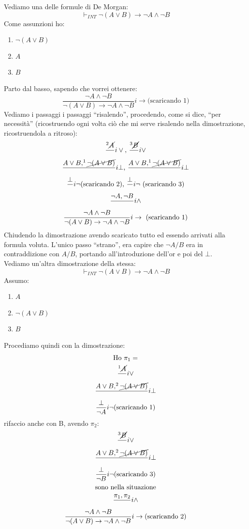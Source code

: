 \documentclass[a4paper,12pt, oneside]{book}
\begin{document}
\begin{esempio}
  Vediamo una delle formule di De Morgan:
  \[\vdash_{INT}\neg(A\lor B)\to \neg A\land \neg B\]
  Come assunzioni ho:
  \begin{enumerate}
    \item $\neg (A\lor B)$
    \item $A$
    \item $B$
  \end{enumerate}
  Parto dal basso, sapendo che vorrei ottenere:
  \[\frac{\neg A\land \neg B}{\neg(A\lor B)\to \neg A\land \neg B}i\to\mbox{
      (scaricando 1)}\]
  Vediamo i passaggi i passaggi ``risalendo'', procedendo, come si dice, ``per
  necessità'' (ricostruendo ogni volta ciò che mi serve risalendo nella
  dimostrazione, ricostruendola a ritroso): 
  \begin{gather*}
    \frac{^2\cancel{A}}{}i\lor \mbox{, } \frac{^3\cancel{B}}{}i\lor\\
    \frac{A\lor B, ^1\cancel{\neg (A\lor B)}}{}i\bot \mbox{, } \frac{A\lor
      B,^1\cancel{\neg (A\lor B)}}{}i\bot\\  
    \frac{\bot}{}i\neg \mbox{(scaricando 2), }\frac{\bot}{}i\neg\mbox{
      (scaricando 3)}\\ 
    \frac{\neg A, \neg B}{}i\land\\
    \frac{\neg A\land \neg B}{\neg(A\lor B)\to \neg A\land \neg B}i\to\mbox{
      (scaricando 1)}
  \end{gather*}
  Chiudendo la dimostrazione avendo scaricato tutto ed essendo arrivati alla
  formula voluta. L'unico passo ``strano'', era capire che $\neg A/B$ era in
  contraddizione con $A/B$, portando all'introduzione dell'or e poi del
  $\bot$.\\
  Vediamo un'altra dimostrazione della stessa:
  \[\vdash_{INT}\neg(A\lor B)\to \neg A\land \neg B\]
  Assumo:
  \begin{enumerate}
    \item $A$
    \item $\neg(A\lor B)$
    \item $B$
  \end{enumerate}
  Procediamo quindi con la dimostrazione:
  \begin{gather*}
    \mbox{Ho }\pi_1 =\\
    \frac{ ^1\cancel{A}}{}i\lor\\
    \frac{A\lor B, ^2\cancel{\neg(A\lor B)}}{}i\bot\\
    \frac{\bot}{\neg A}i\neg\mbox{(scaricando 1)}
  \end{gather*}
  rifaccio anche con B, avendo $\pi_2$:
  \begin{gather*}
    \frac{ ^3\cancel{B}}{}i\lor\\
    \frac{A\lor B, ^2\cancel{\neg(A\lor B)}}{}i\bot\\
    \frac{\bot}{\neg B}i\neg\mbox{(scaricando 3)}\\
    \mbox{sono nella situazione}\\
    \frac{\pi_1, \pi_2}{}i\land\\
    \frac{\neg A \land \neg B}{\neg(A\lor B)\to \neg A\land \neg
    B}i\to\mbox{(scaricando 2)}  
  \end{gather*}
  

\end{esempio}
\end{document}
